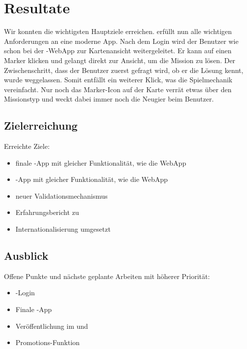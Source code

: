 \chapter{Resultate}
\label{tb-resultate}

Wir konnten die wichtigsten Hauptziele erreichen.
\kort{} erfüllt nun alle wichtigen Anforderungen an eine moderne App.
Nach dem Login wird der Benutzer wie schon bei der \kort{}-\gls{WebApp} zur Kartenansicht weitergeleitet.
Er kann auf einen Marker klicken und gelangt direkt zur Ansicht, um die Mission zu lösen.
Der Zwischenschritt, dass der Benutzer zuerst gefragt wird, ob er die Lösung kennt, wurde weggelassen.
Somit entfällt ein weiterer Klick, was die Spielmechanik vereinfacht.
Nur noch das Marker-Icon auf der Karte verrät etwas über den Missionstyp und weckt dabei immer noch die Neugier beim Benutzer.


\section{Zielerreichung}
Erreichte Ziele:

\begin{itemize}
	\item finale -App mit gleicher Funktionalität, wie die \gls{WebApp}
	\item {}-App mit gleicher Funktionalität, wie die \gls{WebApp}
	\item neuer Validationsmechanismus
	\item Erfahrungsbericht zu 
	\item Internationalisierung umgesetzt
\end{itemize}

\section{Ausblick}
Offene Punkte und nächste geplante Arbeiten mit höherer Priorität:

\begin{itemize}
	\item {}-Login
	\item Finale -App
	\item Veröffentlichung im  und  
	\item Promotions-Funktion
\end{itemize}

